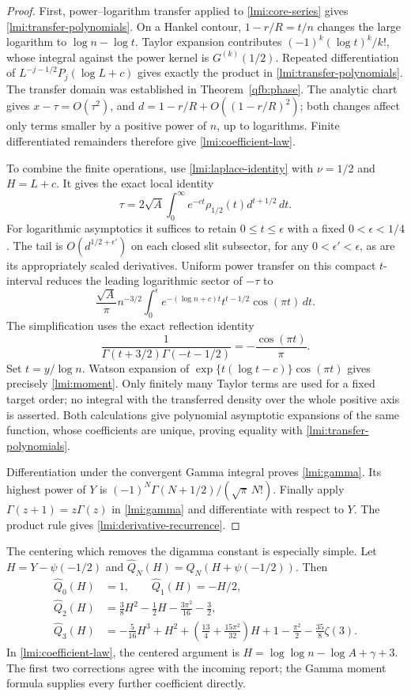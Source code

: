 \begin{proof}
First, power--logarithm transfer \cite{qfb:transfer} applied to
\eqref{lmi:core-series} gives \eqref{lmi:transfer-polynomials}.
On a Hankel contour, $1-r/R=t/n$ changes the large logarithm to
$\log n-\log t$. Taylor expansion contributes
$(-1)^k(\log t)^k/k!$, whose integral against the power kernel
is $G^{(k)}(1/2)$. Repeated differentiation of
$L^{-j-1/2}P_j(\log L+c)$ gives exactly the product in
\eqref{lmi:transfer-polynomials}. The transfer domain was established
in Theorem~\ref{qfb:phase}. The analytic chart gives
$x-\tau=O(\tau^2)$, and $d=1-r/R+O((1-r/R)^2)$; both changes
affect only terms smaller by a positive power of $n$, up to logarithms.
Finite differentiated remainders therefore give
\eqref{lmi:coefficient-law}.

To combine the finite operations, use \eqref{lmi:laplace-identity}
with $\nu=1/2$ and $H=L+c$. It gives the exact local identity
\[
 \tau=2\sqrt A\int_0^\infty
             e^{-ct}\rho_{1/2}(t)d^{t+1/2}\,dt .
\]
For logarithmic asymptotics it suffices to retain $0\le t\le\epsilon$
with a fixed $0<\epsilon<1/4$. The tail is
$O(d^{1/2+\epsilon'})$ on each closed slit subsector, for any
$0<\epsilon'<\epsilon$, as are its appropriately scaled derivatives.
Uniform power transfer on this compact $t$-interval reduces the
leading logarithmic sector of $-\tau$ to
\[
 \frac{\sqrt A}{\pi}n^{-3/2}
 \int_0^\epsilon e^{-(\log n+c)t}t^{t-1/2}\cos(\pi t)\,dt .
\]
The simplification uses the exact reflection identity
\[
 \frac1{\Gamma(t+3/2)\Gamma(-t-1/2)}
       =-\frac{\cos(\pi t)}{\pi}.
\]
Set $t=y/\log n$. Watson expansion of
$\exp\{t(\log t-c)\}\cos(\pi t)$ gives precisely
\eqref{lmi:moment}. Only finitely many Taylor terms are used for a
fixed target order; no integral with the transferred density over the
whole positive axis is asserted. Both calculations give polynomial
asymptotic expansions of the same function, whose coefficients are
unique, proving equality with \eqref{lmi:transfer-polynomials}.

Differentiation under the convergent Gamma integral proves
\eqref{lmi:gamma}. Its highest power of $Y$ is
$(-1)^N\Gamma(N+1/2)/(\sqrt\pi\,N!)$.
Finally apply $\Gamma(z+1)=z\Gamma(z)$ in
\eqref{lmi:gamma} and differentiate with respect to $Y$.
The product rule gives \eqref{lmi:derivative-recurrence}.
\end{proof}

The centering which removes the digamma constant is especially simple.
Let $H=Y-\psi(-1/2)$ and
$\widehat Q_N(H)=Q_N(H+\psi(-1/2))$. Then
\begin{align*}
 \widehat Q_0(H)&=1,\qquad \widehat Q_1(H)=-H/2,\\
 \widehat Q_2(H)&=\frac38H^2-\frac12H-\frac{3\pi^2}{16}-\frac32,\\
 \widehat Q_3(H)&=-\frac5{16}H^3+H^2
       +\left(\frac{13}{4}+\frac{15\pi^2}{32}\right)H
       +1-\frac{\pi^2}{2}-\frac{35}{8}\zeta(3).
\end{align*}
In \eqref{lmi:coefficient-law}, the centered argument is
$H=\log\log n-\log A+\gamma+3$.
The first two corrections agree with the incoming report; the Gamma
moment formula supplies every further coefficient directly.

